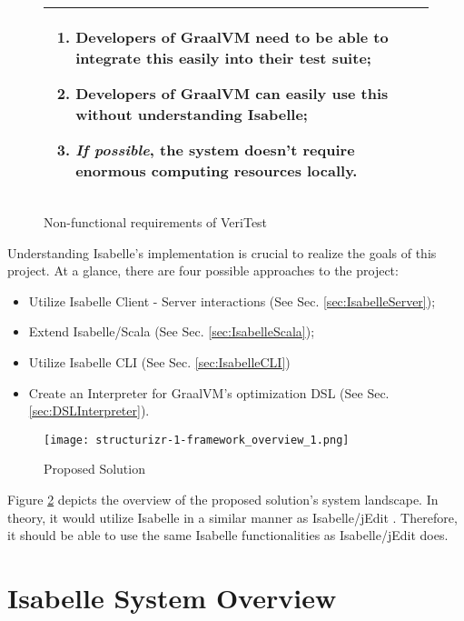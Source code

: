 \begin{figure}[h]
      \begin{tabular}{|L{0.95\textwidth}|}
            \hline
            \begin{enumerate}
                  \item Developers of GraalVM need to be able to integrate this easily into their test suite;
                  \item Developers of GraalVM can easily use this without understanding Isabelle;
                  \item \emph{If possible}, the system doesn't require enormous computing resources locally.
            \end{enumerate} \\
            \hline
      \end{tabular}
      \caption{Non-functional requirements of VeriTest}
      \label{fig:requirements}
\end{figure}

Understanding Isabelle's implementation is crucial to realize the goals of this project. At a glance, there are four possible approaches 
to the project:

\begin{itemize}
    \item Utilize Isabelle Client - Server interactions (See Sec. \ref{sec:IsabelleServer});
    \item Extend Isabelle/Scala (See Sec. \ref{sec:IsabelleScala});
    \item Utilize Isabelle CLI (See Sec. \ref{sec:IsabelleCLI})
    \item Create an Interpreter for GraalVM's optimization DSL (See Sec. \ref{sec:DSLInterpreter}).
\end{itemize}

\begin{figure}[h]
      \centering
      \texttt{[image: structurizr-1-framework\_overview\_1.png]}
      \caption{Proposed Solution}
      \label{fig:SystemLandscape}
\end{figure}

Figure \ref{fig:SystemLandscape} depicts the overview of the proposed solution's system landscape. In theory, it would utilize Isabelle in a similar 
manner as Isabelle/jEdit \cite{isabelleSystem}. Therefore, it should be able to use the same Isabelle functionalities as Isabelle/jEdit does.

\section{Isabelle System Overview}
\label{sec:IsabelleSystemOverview}

